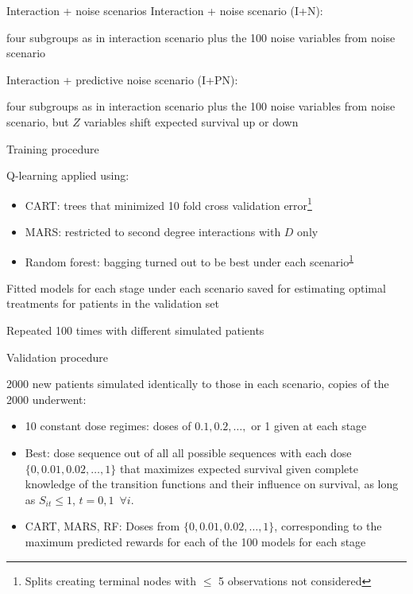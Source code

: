 \documentclass[handout]{beamer}
\begin{document}
\begin{frame}[c]{Interaction + noise scenarios}
  Interaction + noise scenario (I+N):
  
  four subgroups as in interaction scenario plus the 100 noise variables from noise scenario
  
  \bigskip
  
  Interaction + predictive noise scenario (I+PN):
  
  four subgroups as in interaction scenario plus the 100 noise variables from noise scenario, but $Z$ variables shift expected survival up or down
\end{frame}


\begin{frame}[c]{Training procedure}
  
  Q-learning applied using:
  \begin{itemize}
    \item CART: trees that minimized 10 fold cross validation error\footnote{\label{tree} Splits creating terminal nodes with $\leq$ 5 observations not considered}
    \item MARS: restricted to second degree interactions with $D$ only
    \item Random forest: bagging turned out to be best under each scenario\textsuperscript{\ref{tree}}
  \end{itemize}
  
  Fitted models for each stage under each scenario saved for estimating optimal treatments for patients in the validation set
  
  Repeated 100 times with different simulated patients
\end{frame}

\begin{frame}[t]{Validation procedure}
  
  2000 new patients simulated identically to those in each scenario, copies of the 2000 underwent:
  \begin{itemize}
    \item 10 constant dose regimes: doses of $0.1, 0.2, \ldots,$ or 1 given at each stage
    \item Best: dose sequence out of all all possible sequences with each dose $\{0, 0.01, 0.02, \ldots, 1\}$ that maximizes expected survival given complete knowledge of the transition functions and their influence on survival, as long as $S_{it} \leq 1$, $t = 0, 1 \enspace \forall i$.
    \item CART, MARS, RF: Doses from $\{0, 0.01, 0.02, \ldots, 1\}$, corresponding to the maximum predicted rewards for each of the 100 models for each stage
  \end{itemize}
\end{frame}
\end{document}
